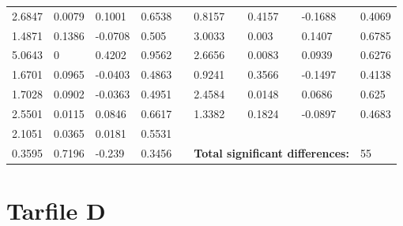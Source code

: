 \begin{table}[h!]
\begin{tabular}{lllllllll}
2.6847 & 0.0079 & 0.1001 & 0.6538 &  & 0.8157 & 0.4157 & -0.1688 & 0.4069 \\
1.4871 & 0.1386 & -0.0708 & 0.505 &  & 3.0033 & 0.003 & 0.1407 & 0.6785 \\
5.0643 & 0 & 0.4202 & 0.9562 &  & 2.6656 & 0.0083 & 0.0939 & 0.6276 \\
1.6701 & 0.0965 & -0.0403 & 0.4863 &  & 0.9241 & 0.3566 & -0.1497 & 0.4138 \\
1.7028 & 0.0902 & -0.0363 & 0.4951 &  & 2.4584 & 0.0148 & 0.0686 & 0.625 \\
2.5501 & 0.0115 & 0.0846 & 0.6617 &  & 1.3382 & 0.1824 & -0.0897 & 0.4683 \\ \cline{6-9} 
2.1051 & 0.0365 & 0.0181 & 0.5531 &  &  &  &  &  \\
0.3595 & 0.7196 & -0.239 & 0.3456 &  & \multicolumn{3}{l}{\textbf{Total significant differences:}} & 55
\end{tabular}
\end{table}

\chapter{Tarfile D}


